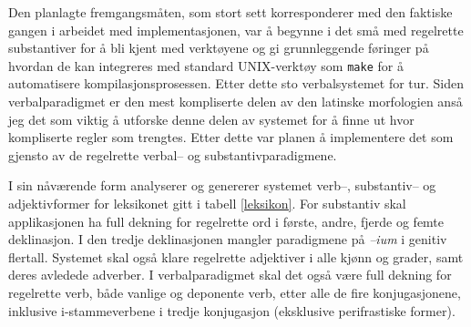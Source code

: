 \documentclass{article}
\newcommand\note[1]{\marginpar{\raggedright\tiny#1}}
\let\prog\texttt
\let\w\emph
\begin{document}
Den planlagte fremgangsm\aa{}ten, som stort sett korresponderer med den
faktiske gangen i arbeidet med implementasjonen, var \aa{} begynne i det
sm\aa{} med regelrette substantiver for \aa{} bli kjent med verkt\o{}yene og
gi grunnleggende f\o{}ringer p\aa{} hvordan de kan integreres med standard
UNIX-verkt\o{}y som \prog{make} for \aa{} automatisere kompilasjonsprosessen.
Etter dette sto verbalsystemet for tur. Siden verbalparadigmet er den mest
kompliserte delen av den latinske morfologien ans\aa{} jeg det som viktig
\aa{} utforske denne delen av systemet for \aa{} finne ut hvor kompliserte
regler som trengtes. Etter dette var planen \aa{} implementere det som gjensto
av de regelrette verbal-- og substantivparadigmene.

I sin n\aa{}v\ae{}rende form analyserer og genererer systemet verb--,
substantiv-- og adjektivformer for leksikonet gitt i tabell \ref{leksikon}.
For substantiv skal applikasjonen ha full dekning for regelrette ord i
f\o{}rste, andre, fjerde og femte deklinasjon. I den tredje deklinasjonen
mangler paradigmene p\aa{} \w{--ium} i genitiv flertall. Systemet skal
ogs\aa{} klare regelrette adjektiver i alle kj\o{}nn og grader, samt deres
avledede adverber. I verbalparadigmet skal det ogs\aa{} v\ae{}re full dekning
for regelrette verb, b\aa{}de vanlige og deponente verb, etter alle de fire
konjugasjonene, inklusive i-stammeverbene i tredje konjugasjon (eksklusive
perifrastiske former).
\end{document}

